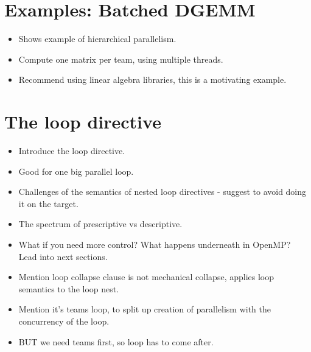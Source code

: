 \section{Examples: Batched DGEMM}
\begin{itemize}
  \item Shows example of hierarchical parallelism.
  \item Compute one matrix per team, using multiple threads.
  \item Recommend using linear algebra libraries, this is a motivating example.
\end{itemize}

\section{The loop directive}
\label{sec:loop}
\begin{itemize}
  \item Introduce the loop directive.
  \item Good for one big parallel loop.
  \item Challenges of the semantics of nested loop directives - suggest to avoid doing it on the target.
  \item The spectrum of prescriptive vs descriptive.
  \item What if you need more control? What happens underneath in OpenMP? Lead into next sections.
  \item Mention loop collapse clause is not mechanical collapse, applies loop semantics to the loop nest.
  \item Mention it's teams loop, to split up creation of parallelism with the concurrency of the loop.
  \item BUT we need teams first, so loop has to come after.
\end{itemize}
